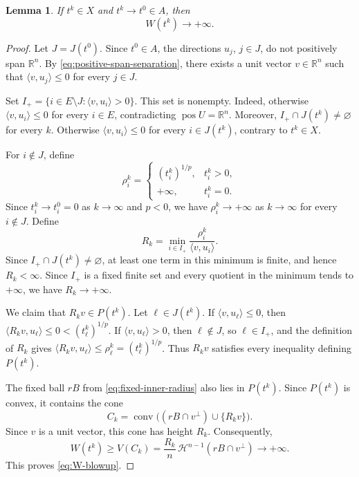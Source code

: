 \documentclass[12pt,reqno]{amsart}
\numberwithin{equation}{section}
\newtheorem{lemma}[theorem]{Lemma}
\theoremstyle{remark}
\DeclareMathOperator{\pos}{pos}
\newcommand{\R}{\mathbb R}
\newcommand{\Haus}{\mathcal H}
\begin{document}
\begin{lemma}\label{lem:W-blowup}
If $t^k\in X$ and $t^k\to t^0\in A$, then
\begin{equation}\label{eq:W-blowup}
 W(t^k)\longrightarrow+\infty.
\end{equation}
\end{lemma}

\begin{proof}
	Let \(J=J(t^0)\). Since \(t^0\in A\), the directions
	\(u_j\), \(j\in J\), do not positively span \(\R^n\).
	By \eqref{eq:positive-span-separation}, there exists a unit vector
	\(v\in\R^n\) such that
	\(\langle v,u_j\rangle\leq0\) for every \(j\in J\).
	
	Set
	\(I_+=\{i\in E\setminus J:\langle v,u_i\rangle>0\}\).
	This set is nonempty. Indeed, otherwise
	\(\langle v,u_i\rangle\leq0\) for every \(i\in E\), contradicting
	\(\pos U=\R^n\). Moreover,
	\(I_+\cap J(t^k)\neq\varnothing\) for every \(k\). Otherwise
	\(\langle v,u_i\rangle\leq0\) for every \(i\in J(t^k)\), contrary
	to \(t^k\in X\).
	
	For \(i\notin J\), define
	\begin{equation}\label{eq:vanishing-supports}
		\rho_i^k=
		\begin{cases}
			(t_i^k)^{1/p},&t_i^k>0,\\
			+\infty,&t_i^k=0.
		\end{cases}
	\end{equation}
	Since \(t_i^k\to t_i^0=0\) as \(k\to\infty\) and \(p<0\), we have
	\(\rho_i^k\to+\infty\) as \(k\to\infty\) for every \(i\notin J\). Define
	\[
	R_k
	=
	\min_{i\in I_+}
	\frac{\rho_i^k}{\langle v,u_i\rangle}.
	\]
	Since \(I_+\cap J(t^k)\neq\varnothing\), at least one term in this
	minimum is finite, and hence \(R_k<\infty\). Since \(I_+\) is a
	fixed finite set and every quotient in the minimum tends to
	\(+\infty\), we have \(R_k\to+\infty\).
	
	We claim that \(R_kv\in P(t^k)\). Let
	\(\ell\in J(t^k)\). If \(\langle v,u_\ell\rangle\leq0\), then
	\(\langle R_kv,u_\ell\rangle\leq0<(t_\ell^k)^{1/p}\).
	If \(\langle v,u_\ell\rangle>0\), then
	\(\ell\notin J\), so \(\ell\in I_+\), and the definition of \(R_k\)
	gives
	\(\langle R_kv,u_\ell\rangle\leq
	\rho_\ell^k=(t_\ell^k)^{1/p}\).
	Thus \(R_kv\) satisfies every inequality defining \(P(t^k)\).
	
	The fixed ball \(rB\) from \eqref{eq:fixed-inner-radius} also lies
	in \(P(t^k)\). Since \(P(t^k)\) is convex, it contains the cone
	\[
	C_k
	=
	\operatorname{conv}
	\bigl((rB\cap v^\perp)\cup\{R_kv\}\bigr).
	\]
	Since \(v\) is a unit vector, this cone has height \(R_k\).
	Consequently,
	\[
	W(t^k)
	\geq V(C_k)
	=
	\frac{R_k}{n}\,
	\Haus^{n-1}(rB\cap v^\perp)
	\longrightarrow+\infty.
	\]
	This proves \eqref{eq:W-blowup}.
\end{proof}
\end{document}
